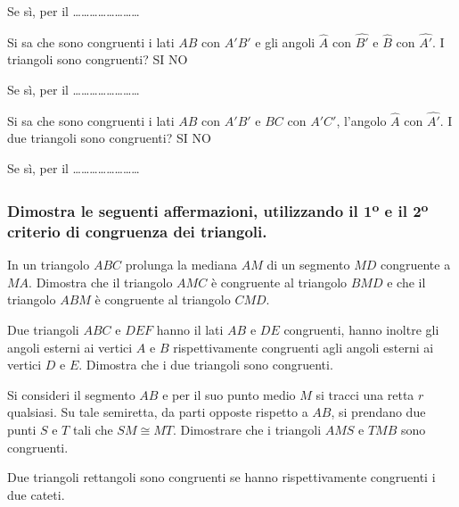 Se sì, per il \ldots\ldots\ldots\ldots\ldots\ldots\ldots\ldots


Si sa che sono congruenti i lati $AB$ con $A'B'$ e gli angoli $\widehat{A}$ con $\widehat{B'}$ e $\widehat{B}$ con $\widehat{A'}$.
I triangoli sono congruenti? 		SI	NO

Se sì, per il \ldots\ldots\ldots\ldots\ldots\ldots\ldots\ldots


Si sa che sono congruenti i lati $AB$ con $A'B'$ e $BC$ con $A'C'$, l'angolo $\widehat{A}$ con $\widehat{A'}$.
I due triangoli sono congruenti? 	SI	NO

Se sì, per il \ldots\ldots\ldots\ldots\ldots\ldots\ldots\ldots


\begin{multicols}{2}

\subsubsection*{Dimostra le seguenti affermazioni, utilizzando il 1\textsuperscript{o} e il 2\textsuperscript{o} criterio di congruenza dei triangoli.}

\begin{esercizio}
\label{ese:2.5}
In un triangolo $ABC$ prolunga la mediana $AM$ di un segmento $MD$ congruente a $MA$. Dimostra che il triangolo $AMC$ è congruente al triangolo $BMD$ e che il triangolo $ABM$ è congruente al triangolo $CMD$.
\end{esercizio}

\begin{esercizio}
\label{ese:2.6}
Due triangoli $ABC$ e $DEF$ hanno il lati $AB$ e $DE$ congruenti, hanno inoltre gli angoli esterni ai vertici $A$ e $B$ rispettivamente congruenti agli angoli esterni ai vertici $D$ e $E$. Dimostra che i due triangoli sono congruenti.
\end{esercizio}

\begin{esercizio}
\label{ese:2.7}
Si consideri il segmento $AB$ e per il suo punto medio $M$ si tracci una retta $r$ qualsiasi. Su tale semiretta, da parti opposte rispetto a $AB$, si prendano due punti $S$ e $T$ tali che $SM\cong MT$. Dimostrare che i triangoli $AMS$ e $TMB$ sono congruenti.
\end{esercizio}

\begin{esercizio}
\label{ese:2.8}
Due triangoli rettangoli sono congruenti se hanno rispettivamente congruenti i due cateti.
\end{esercizio}


\end{multicols}
